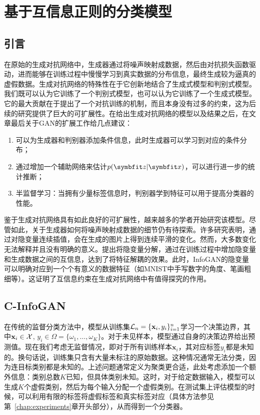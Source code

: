 \chapter{基于互信息正则的分类模型}\label{chap:model}

\section{引言}
在原始的生成对抗网络中，生成器通过将噪声映射成数据，然后由对抗损失函数驱动，进而能够在训练过程中慢慢学习到真实数据的分布信息，最终生成较为逼真的虚假数据。生成对抗网络的特殊性在于它创新地结合了生成式模型和判别式模型。我们既可以认为它训练了一个判别式模型，也可以认为它训练了一个生成式模型。它的最大贡献在于提出了一个对抗训练的机制，而且本身没有过多的约束，这为后续的研究提供了巨大的可扩展性。\citet{goodfellow2014generative}在给出生成对抗网络的模型以及结果之后，在文章最后关于GAN的扩展工作给几点建议：
\begin{enumerate}
  \item 可以为生成器和判别器添加条件信息，此时生成器可以学习到对应的条件分布；
  \item 通过增加一个辅助网络来估计$p(\bd{z}|\bd{x})$，可以进行进一步的统计推断；
  \item 半监督学习：当拥有少量标签信息时，判别器学到特征可以用于提高分类器的性能。
\end{enumerate}

鉴于生成对抗网络具有如此良好的可扩展性，越来越多的学者开始研究该模型\citep{mirza2014conditional,radford2015unsupervised,chongxuan2017triple}。尽管如此，关于生成器如何将噪声映射成数据的细节仍有待探索。许多研究表明，通过对隐变量连续插值，会在生成的图片上得到连续平滑的变化\citep{radford2015unsupervised,chen2016infogan,dumoulin2016adversarially,miyato2018cgans}。然而，大多数变化无法解释并且没有明确的意义。\citet{chen2016infogan}提出将隐变量分解，通过在训练过程中增加隐变量和生成数据之间的互信息，达到了将特征解耦的效果。此时，InfoGAN的隐变量可以明确对应到一个个有意义的数据特征（如MNIST中手写数字的角度、笔画粗细等）。这证明了互信息约束在生成对抗网络中有值得探究的作用。

\section{C-InfoGAN}\label{sec:c-infogan}
在传统的监督分类方法中，模型从训练集$\mathcal{L}_n = \{\mathbf{x}_i, y_i\}_{i=1}^n$学习一个决策边界，其中$\mathbf{x}_i \in \mathcal{X}$, $y_i \in \Omega = \{\omega_1, \dots, \omega_K\}$。对于未见样本，模型通过自身的决策边界给出预测值。现在我们考虑无监督情况，即对于所有训练样本$\mathbf{x}_i$，其对应标签$y_i$都是未知的。换句话说，训练集只含有大量未标注的原始数据。这种情况通常无法分类，因为连目标类别都是未知的。上述问题通常定义为聚类更合适，此处考虑添加一个额外信息：类别总数$K$已知，但具体类别未知。这时，对于给定数据输入，模型可以生成$K$个虚假类别，然后为每个输入分配一个虚假类别。在测试集上评估模型的时候，可以利用有限的标签将虚假标签和真实标签对应（具体方法参见第~\ref{chap:experiments}章开头部分），从而得到一个分类器。

